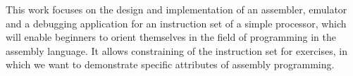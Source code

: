 This work focuses on the design and implementation of an assembler, emulator and a debugging application for an instruction set of a simple processor, which will enable beginners to orient themselves in the field of programming in the assembly language. It allows constraining of the instruction set for exercises, in which we want to demonstrate specific attributes of assembly programming.
